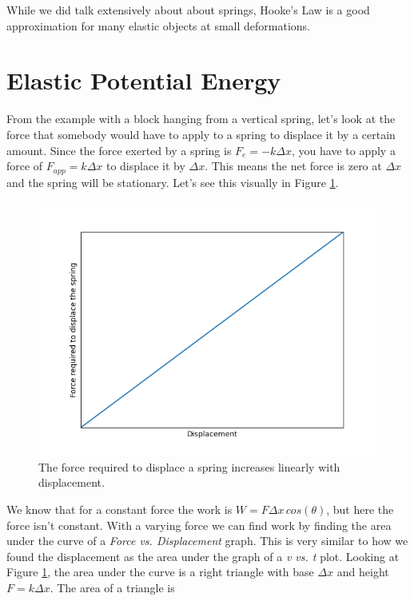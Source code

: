 \documentclass[12pt]{book}
\begin{document}
While we did talk extensively about about springs, Hooke's Law is a good approximation for many elastic objects at small deformations. 

\section{Elastic Potential Energy}

From the example with a block hanging from a vertical spring, let's look at the force that somebody would have to apply to a spring to displace it by a certain amount. Since the force exerted by a spring is $F_e = -k \Delta x$, you have to apply a force of $F_{app} = k \Delta x$ to displace it by $\Delta x$. This means the net force is zero at $\Delta x$ and the spring will be stationary. Let's see this visually in Figure \ref{fspring}.

\begin{figure}[H]
\centering
\includegraphics[scale=0.6]{force_spring.png}
\caption{The force required to displace a spring increases linearly with displacement.}
\label{fspring}
\end{figure}

We know that for a constant force the work is $W = F \Delta x \, cos(\theta)$, but here the force isn't constant. With a varying force we can find work by finding the area under the curve of a \textit{Force vs. Displacement} graph. This is very similar to how we found the displacement as the area under the graph of a \textit{v vs. t} plot. Looking at Figure \ref{fspring}, the area under the curve is a right triangle with base $\Delta x$ and height $F = k \Delta x$. The area of a triangle is
\end{document}
